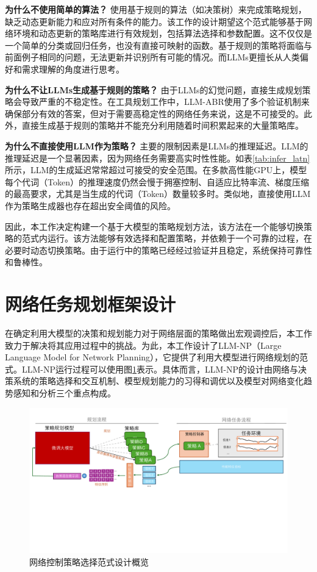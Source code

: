 \textbf{为什么不使用简单的算法？} 使用基于规则的算法（如决策树）来完成策略规划，缺乏动态更新能力和应对所有条件的能力。该工作的设计期望这个范式能够基于网络环境和动态更新的策略库进行有效规划，包括算法选择和参数配置。这不仅仅是一个简单的分类或回归任务，也没有直接可映射的函数。基于规则的策略将面临与前面例子相同的问题，无法更新并识别所有可能的情况。而LLMs更擅长从人类偏好和需求理解的角度进行思考。

\textbf{为什么不让LLMs生成基于规则的策略？} 由于LLMs的幻觉问题，直接生成规划策略会导致严重的不稳定性。在工具规划工作中，LLM-ABR使用了多个验证机制来确保部分有效的答案，但对于需要高稳定性的网络任务来说，这是不可接受的。此外，直接生成基于规则的策略并不能充分利用随着时间积累起来的大量策略库。

\textbf{为什么不直接使用LLM作为策略？} 主要的限制因素是LLMs的推理延迟。LLM的推理延迟是一个显著因素，因为网络任务需要高实时性性能。如表\ref{tab:infer_latn}所示，LLM的生成延迟常常超过可接受的安全范围。在多款高性能GPU上，模型每个代词（Token）的推理速度仍然会慢于拥塞控制、自适应比特率流、梯度压缩的最高要求，尤其是当生成的代词（Token）数量较多时。类似地，直接使用LLM作为策略生成器也存在超出安全阈值的风险。



因此，本工作决定构建一个基于大模型的策略规划方法，该方法在一个能够切换策略的范式内运行。该方法能够有效选择和配置策略，并依赖于一个可靠的过程，在必要时动态切换策略。由于运行中的策略已经经过验证并且稳定，系统保持可靠性和鲁棒性。




\section{网络任务规划框架设计}
在确定利用大模型的决策和规划能力对于网络层面的策略做出宏观调控后，本工作致力于解决将其应用过程中的挑战。为此，本工作设计了LLM-NP（Large Language Model for Network Planning），它提供了利用大模型进行网络规划的范式。LLM-NP运行过程可以使用图\ref{fig_llmcc_design}表示。具体而言，LLM-NP的设计由网络与决策系统的策略选择和交互机制、模型规划能力的习得和调优以及模型对网络变化趋势感知和分析三个重点构成。

\begin{figure} [ht]
\centering
\includegraphics[width=\textwidth]{figures/chap04/design.pdf} 
\caption{网络控制策略选择范式设计概览}
\label{fig_llmcc_design}
\end{figure}


